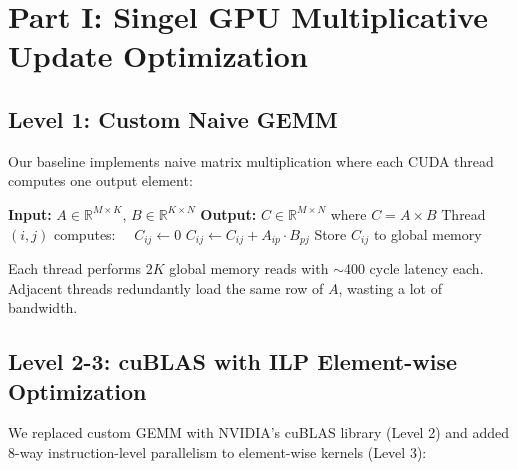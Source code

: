 \documentclass[11pt]{article}
\begin{document}
\section{Part I: Singel GPU Multiplicative Update Optimization}

\subsection{Level 1: Custom Naive GEMM}

Our baseline implements naive matrix multiplication where each CUDA thread computes one output element:

\begin{algorithm}[H]
\caption{Naive GEMM Kernel (Level 1)}
\begin{algorithmic}
\STATE \textbf{Input:} $A \in \mathbb{R}^{M \times K}$, $B \in \mathbb{R}^{K \times N}$
\STATE \textbf{Output:} $C \in \mathbb{R}^{M \times N}$ where $C = A \times B$
\STATE
\STATE Thread$(i, j)$ computes:
\STATE $\quad C_{ij} \leftarrow 0$
    \STATE $C_{ij} \leftarrow C_{ij} + A_{ip} \cdot B_{pj}$ 
\ENDFOR
\STATE Store $C_{ij}$ to global memory
\end{algorithmic}
\end{algorithm}

Each thread performs $2K$ global memory reads with $\sim$400 cycle latency each. Adjacent threads redundantly load the same row of $A$, wasting a lot of bandwidth.

\subsection{Level 2-3: cuBLAS with ILP Element-wise Optimization}

We replaced custom GEMM with NVIDIA's cuBLAS library (Level 2) and added 8-way instruction-level parallelism to element-wise kernels (Level 3):
\end{document}
